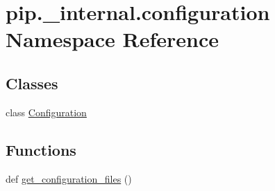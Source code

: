 \hypertarget{namespacepip_1_1__internal_1_1configuration}{}\section{pip.\+\_\+internal.\+configuration Namespace Reference}
\label{namespacepip_1_1__internal_1_1configuration}
\subsection*{Classes}
\begin{DoxyCompactItemize}
\item 
class \hyperlink{classpip_1_1__internal_1_1configuration_1_1Configuration}{Configuration}
\end{DoxyCompactItemize}
\subsection*{Functions}
\begin{DoxyCompactItemize}
\item 
def \hyperlink{namespacepip_1_1__internal_1_1configuration_a31b86949f0f8421f967fd963eff82753}{get\+\_\+configuration\+\_\+files} ()
\end{DoxyCompactItemize}
